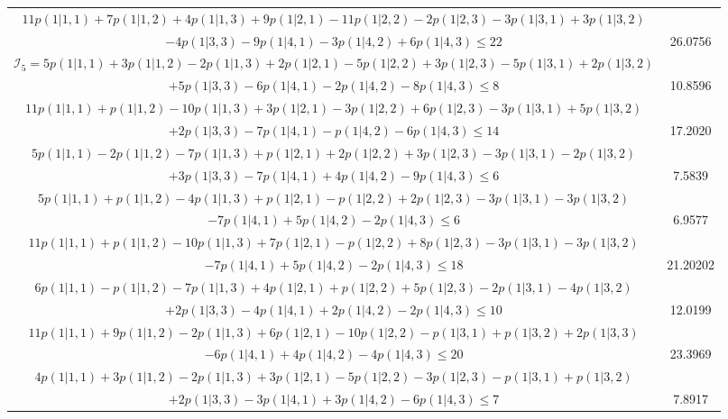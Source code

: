 \documentclass[11pt]{article}
\begin{document}
\begin{table}[htbp]
{\begin{tabular}{|c|c|}
      $11p(1|1,1) +7p(1|1,2) +4p(1|1,3) +9p(1|2,1) -11p(1|2,2) -2p(1|2,3) -3p(1|3,1) +3p(1|3,2) $&\\$ -4p(1|3,3) -9p(1|4,1) -3p(1|4,2) +6p(1|4,3) \leqslant 22$ & 26.0756 \\ \hline

      $\mathcal{I}_5=5p(1|1,1) +3p(1|1,2) -2p(1|1,3) +2p(1|2,1) -5p(1|2,2) +3p(1|2,3) -5p(1|3,1) +2p(1|3,2) $&\\$ +5p(1|3,3) -6p(1|4,1) -2p(1|4,2) -8p(1|4,3) \leqslant 8$ & 10.8596 \\ \hline

      $11p(1|1,1) +p(1|1,2) -10p(1|1,3) +3p(1|2,1) -3p(1|2,2) +6p(1|2,3) -3p(1|3,1) +5p(1|3,2) $&\\$ +2p(1|3,3) -7p(1|4,1) -p(1|4,2) -6p(1|4,3) \leqslant 14$ & 17.2020 \\ \hline
      
      $5p(1|1,1) -2p(1|1,2) -7p(1|1,3) +p(1|2,1) +2p(1|2,2) +3p(1|2,3) -3p(1|3,1) -2p(1|3,2) $&\\$+3p(1|3,3) -7p(1|4,1) +4p(1|4,2) -9p(1|4,3) \leqslant 6$ & 7.5839 \\ \hline

      $5p(1|1,1) +p(1|1,2) -4p(1|1,3) +p(1|2,1) -p(1|2,2) +2p(1|2,3) -3p(1|3,1) -3p(1|3,2) $&\\$-7p(1|4,1) +5p(1|4,2) -2p(1|4,3) \leqslant 6$ & 6.9577 \\ \hline

      $11p(1|1,1) +p(1|1,2) -10p(1|1,3) +7p(1|2,1) -p(1|2,2) +8p(1|2,3) -3p(1|3,1) -3p(1|3,2) $&\\$ -7p(1|4,1) +5p(1|4,2) -2p(1|4,3) \leqslant 18$ & 21.20202 \\ \hline

      $6p(1|1,1) -p(1|1,2) -7p(1|1,3) +4p(1|2,1) +p(1|2,2) +5p(1|2,3) -2p(1|3,1) -4p(1|3,2) $&\\$ +2p(1|3,3) -4p(1|4,1) +2p(1|4,2) -2p(1|4,3) \leqslant 10$ &  12.0199 \\ \hline

      $11p(1|1,1) +9p(1|1,2) -2p(1|1,3) +6p(1|2,1) -10p(1|2,2) -p(1|3,1) +p(1|3,2) +2p(1|3,3) $&\\$-6p(1|4,1) +4p(1|4,2) -4p(1|4,3) \leqslant 20$ & 23.3969 \\ \hline

      $4p(1|1,1) +3p(1|1,2) -2p(1|1,3) +3p(1|2,1) -5p(1|2,2) -3p(1|2,3) -p(1|3,1) +p(1|3,2) $&\\$+2p(1|3,3) -3p(1|4,1) +3p(1|4,2) -6p(1|4,3) \leqslant 7$ & 7.8917\\ \hline
      

\end{tabular}}
\end{table}
\end{document}
